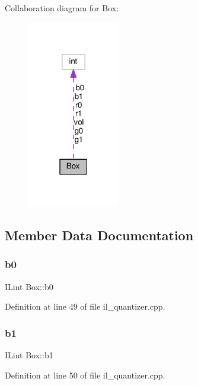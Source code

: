 Collaboration diagram for Box\+:
\nopagebreak
\begin{figure}[H]
\begin{center}
\leavevmode
\includegraphics[width=114pt]{df/dd3/structBox__coll__graph}
\end{center}
\end{figure}


\subsection{Member Data Documentation}
\mbox{\label{structBox_a0d46b2540647ed5b49314ebe710a944e}} 
\subsubsection{\texorpdfstring{b0}{b0}}
{\footnotesize\ttfamily I\+Lint Box\+::b0}



Definition at line 49 of file il\+\_\+quantizer.\+cpp.

\mbox{\label{structBox_a3d77cc7c0b9e7ad76d492a2310f988f0}} 
\subsubsection{\texorpdfstring{b1}{b1}}
{\footnotesize\ttfamily I\+Lint Box\+::b1}



Definition at line 50 of file il\+\_\+quantizer.\+cpp.

\mbox{\label{structBox_ae56c641f16bbbb4bb217ca348535f2b6}} 
